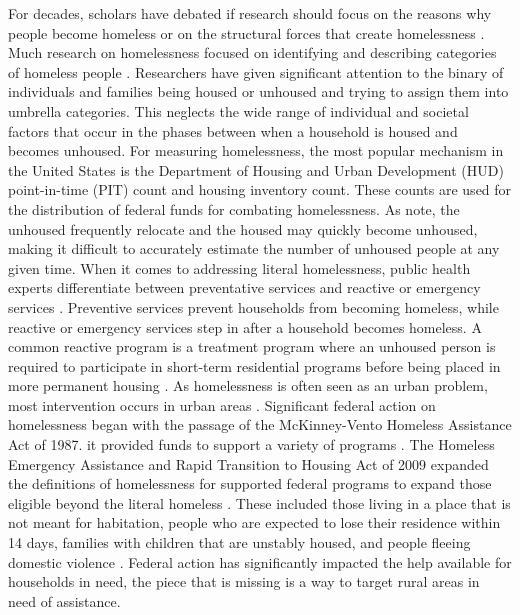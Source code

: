For decades, scholars have debated if research should focus on the reasons why people become homeless or on the structural forces that create homelessness \citep{shlay_social_2003}. Much research on homelessness focused on identifying and describing categories of homeless people \citep{lee_homelessness_2021}. Researchers have given significant attention to the binary of individuals and families being housed or unhoused and trying to assign them into umbrella categories. This neglects the wide range of individual and societal factors that occur in the phases between when a household is housed and becomes unhoused. For measuring homelessness, the most popular mechanism in the United States is the Department of Housing and Urban Development (HUD) point-in-time (PIT) count and housing inventory count. These counts are used for the distribution of federal funds for combating homelessness. As \citet{agans_enumerating_2014} note, the unhoused frequently relocate and the housed may quickly become unhoused, making it difficult to accurately estimate the number of unhoused people at any given time. When it comes to addressing literal homelessness, public health experts differentiate between preventative services and reactive or emergency services \citep{oregan_how_2021}. Preventive services prevent households from becoming homeless, while reactive or emergency services step in after a household becomes homeless. A common reactive program is a treatment program where an unhoused person is required to participate in short-term residential programs before being placed in more permanent housing \citep{evans_reducing_2019}. As homelessness is often seen as an urban problem, most intervention occurs in urban areas \citep{gleason_using_2021}. Significant federal action on homelessness began with the passage of the McKinney-Vento Homeless Assistance Act of 1987. it provided funds to support a variety of programs \citep{evans_reducing_2019}. The Homeless Emergency Assistance and Rapid Transition to Housing Act of 2009 expanded the definitions of homelessness for supported federal programs to expand those eligible beyond the literal homeless \citep{berg_hearth_2013}. These included those living in a place that is not meant for habitation, people who are expected to lose their residence within 14 days, families with children that are unstably housed, and people fleeing domestic violence \citep{evans_reducing_2019}. Federal action has significantly impacted the help available for households in need, the piece that is missing is a way to target rural areas in need of assistance. 

